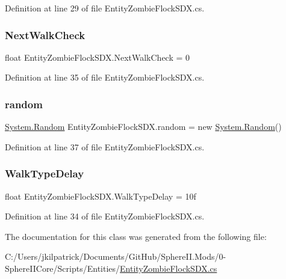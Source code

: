 Definition at line 29 of file Entity\+Zombie\+Flock\+S\+D\+X.\+cs.

\mbox{\label{class_entity_zombie_flock_s_d_x_afc395fe8dd3fa3a8dcd16ecbbde11184}} 
\subsubsection{\texorpdfstring{NextWalkCheck}{NextWalkCheck}}
{\footnotesize\ttfamily float Entity\+Zombie\+Flock\+S\+D\+X.\+Next\+Walk\+Check = 0}



Definition at line 35 of file Entity\+Zombie\+Flock\+S\+D\+X.\+cs.

\mbox{\label{class_entity_zombie_flock_s_d_x_a749fc3c22e52e61118810c1e79080a14}} 
\subsubsection{\texorpdfstring{random}{random}}
{\footnotesize\ttfamily \mbox{\hyperlink{_winter_mod_prefab_8cs_a24953b19d956caa76c403684c71b4e5b}{System.\+Random}} Entity\+Zombie\+Flock\+S\+D\+X.\+random = new \mbox{\hyperlink{_winter_mod_prefab_8cs_a24953b19d956caa76c403684c71b4e5b}{System.\+Random}}()\hspace{0.3cm}{\ttfamily [static]}}



Definition at line 37 of file Entity\+Zombie\+Flock\+S\+D\+X.\+cs.

\mbox{\label{class_entity_zombie_flock_s_d_x_aaf418adc9576be4d53ba9003b8cfddbd}} 
\subsubsection{\texorpdfstring{WalkTypeDelay}{WalkTypeDelay}}
{\footnotesize\ttfamily float Entity\+Zombie\+Flock\+S\+D\+X.\+Walk\+Type\+Delay = 10f}



Definition at line 34 of file Entity\+Zombie\+Flock\+S\+D\+X.\+cs.



The documentation for this class was generated from the following file\+:\begin{DoxyCompactItemize}
\item 
C\+:/\+Users/jkilpatrick/\+Documents/\+Git\+Hub/\+Sphere\+I\+I.\+Mods/0-\/\+Sphere\+I\+I\+Core/\+Scripts/\+Entities/\mbox{\hyperlink{_entity_zombie_flock_s_d_x_8cs}{Entity\+Zombie\+Flock\+S\+D\+X.\+cs}}\end{DoxyCompactItemize}
